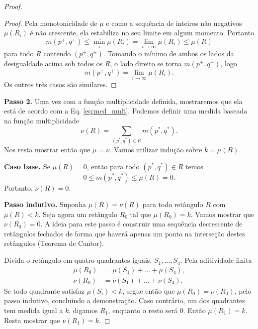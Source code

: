 \begin{proof}
\begin{proof}
    Pela monotonicidade de $\mu$ e como a sequência de inteiros não negativos $\mu(R_i)$ é não 
    crescente, ela estabiliza no seu limite em algum momento. Portanto
    \begin{equation*}
        m(p^+, q^+) \leq \min_i\mu(R_i) = \lim_{i\to\infty} \mu(R_i) \leq \mu(R)
    \end{equation*}
    para todo $R$ contendo $(p^+, q^+)$. Tomando o mínimo de ambos os lados da desigualdade acima 
    sob todos os $R$, o lado direito se torna $m(p^+, q^+)$, logo
    \begin{equation*}
        m(p^+, q^+) = \lim_{i\to\infty}\mu(R_i).
    \end{equation*}
    Os outros três casos são similares. 
\end{proof} 

\textbf{Passo 2.} Uma vez com a função multiplicidade definida, mostraremos que ela está de acordo com a 
Eq. \eqref{eq:med_mult}. Podemos definir uma medida baseada na função multiplicidade
\begin{equation*}
    \nu(R) = \sum_{(p^*, q^*)\in R} m(p^*, q^*).
\end{equation*}
Nos resta mostrar então que $\mu = \nu$. Vamos utilizar indução sobre $k = \mu(R)$. 

\noindent \textbf{Caso base.} Se $\mu(R) = 0$, então para todo $(p^*, q^*) \in R$ temos 
\begin{equation*}
    0 \leq m(p^*, q^*) \leq \mu(R) = 0.
\end{equation*}
Portanto, $\nu(R) = 0$. 

\noindent \textbf{Passo indutivo.} Suponha $\mu(R) = \nu(R)$ para todo retângulo $R$ com 
$\mu(R) < k$. Seja agora um retângulo $R_0$ tal que $\mu(R_0) = k$. Vamos mostrar que $\nu(R_0)
=0$. A ideia para este passo é construir uma sequência decrescente de retângulos fechados 
de forma que haverá apenas um ponto na interseção destes retângulos (Teorema de Cantor). 

Divida o retângulo em quatro quadrantes iguais, $S_1, \dots, S_4$. Pela aditividade finita
\begin{align*}
    \mu(R_0) & = \mu(S_1) + \dots + \mu(S_4), \\
    \nu(R_0) & = \nu(S_1) + \dots + \nu(S_4).
\end{align*}
Se todo quadrante satisfaz $\mu(S_i) < k$, segue então que $\mu(R_0) = \nu(R_0)$, pelo passo indutivo,
concluindo a demonstração. Caso contrário, um dos quadrantes tem medida igual a $k$, digamos $R_1$,
enquanto o resto será $0$. Então $\mu(R_1) = k$. Resta mostrar que $\nu(R_1) = k$. 


\end{proof}
